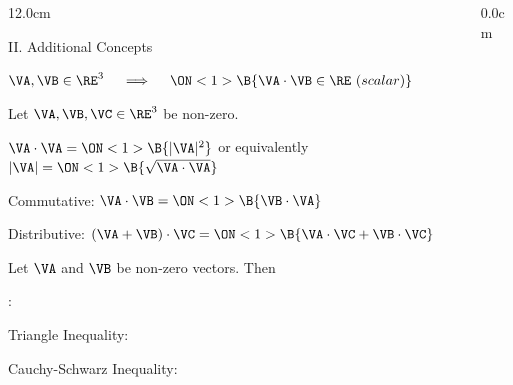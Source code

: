 \begin{frame}
\begin{columns}
\begin{column}{12.0cm}

{II. Additional Concepts}

\vspace{0.2cm}

\scriptsize

\NOTE

\vspace{0.1cm}

\OBUL $\VA,\VB \in \RE^3 \quad \implies \quad \ON<1>{\B{\VA \cdot \VB \in \RE \,\, (scalar)}}$ \\

\vspace{0.7cm}

\PROP Let $\VA, \VB, \VC \in \RE^3$ be non-zero.

\vspace{0.2cm}

\OBUL $\VA \cdot \VA = \ON<1>{\B{|\VA|^2}}$ \quad or equivalently \quad $|\VA| = \ON<1>{\B{\sqrt{\VA \cdot \VA}}}$

\vspace{0.2cm}

\OBUL Commutative: $\VA \cdot \VB = \ON<1>{\B{\VB \cdot \VA}}$

\vspace{0.2cm}

\OBUL Distributive: $(\VA + \VB) \cdot \VC = \ON<1>{\B{\VA \cdot \VC + \VB \cdot \VC}}$

\vspace{0.7cm}

\THM Let $\VA$ and $\VB$ be non-zero vectors.  Then
\begin{center}
\end{center}

\vspace{0.2cm}

:	

\vspace{0.2cm}

\OBUL Triangle Inequality: \quad {}

\vspace{0.2cm}

\OBUL Cauchy-Schwarz Inequality: \quad {}

\vspace{0.7cm}

\end{column}
\begin{column}{0.0cm}\end{column}
\end{columns}
\end{frame}

